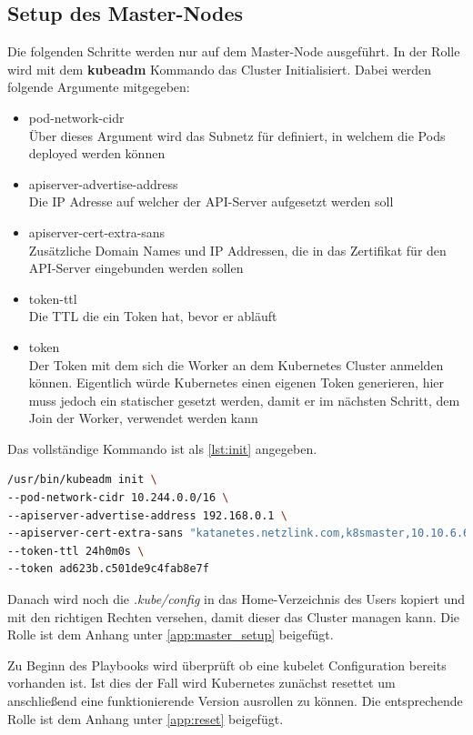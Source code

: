 \subsection{Setup des Master-Nodes}
Die folgenden Schritte werden nur auf dem Master-Node ausgeführt. 
In der Rolle wird mit dem \textbf{kubeadm} Kommando das Cluster Initialisiert.
Dabei werden folgende Argumente mitgegeben:
\begin{itemize}
    \item pod-network-cidr \\ Über dieses Argument wird das Subnetz für definiert, in welchem die Pods deployed werden können
    \item apiserver-advertise-address \\ Die \ac{IP} Adresse auf welcher der \ac{API}-Server aufgesetzt werden soll
    \item apiserver-cert-extra-sans \\ Zusätzliche Domain Names und \ac{IP} Addressen, die in das Zertifikat für den \ac{API}-Server eingebunden werden sollen
    \item token-ttl \\ Die \ac{TTL} die ein Token hat, bevor er abläuft
    \item token \\ Der Token mit dem sich die Worker an dem Kubernetes Cluster anmelden können. Eigentlich würde Kubernetes einen eigenen Token generieren, hier muss jedoch ein statischer gesetzt werden, damit er im nächsten Schritt, dem Join der Worker, verwendet werden kann
\end{itemize}
Das vollständige Kommando ist als \ref{lst:init} angegeben.
\begin{lstlisting}[language=bash, caption={kubeadm init}, label=lst:init]
/usr/bin/kubeadm init \
--pod-network-cidr 10.244.0.0/16 \
--apiserver-advertise-address 192.168.0.1 \
--apiserver-cert-extra-sans "katanetes.netzlink.com,k8smaster,10.10.6.60,192.168.0.1,api.katernetes.local" \
--token-ttl 24h0m0s \
--token ad623b.c501de9c4fab8e7f
\end{lstlisting}

Danach wird noch die \textit{.kube/config} in das Home-Verzeichnis des Users kopiert und mit den richtigen Rechten versehen, damit dieser das Cluster managen kann.
Die Rolle ist dem Anhang unter \ref{app:master_setup} beigefügt.

Zu Beginn des Playbooks wird überprüft ob eine kubelet Configuration bereits vorhanden ist. 
Ist dies der Fall wird Kubernetes zunächst resettet um anschließend eine funktionierende Version ausrollen zu können.
Die entsprechende Rolle ist dem Anhang unter \ref{app:reset} beigefügt.


